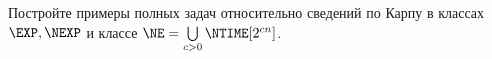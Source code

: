 Постройте примеры полных задач относительно сведений по Карпу в классах $\EXP, \NEXP$ и классе
$\NE = \bigcup\limits_{c > 0} \NTIME[2^{cn}]$.
